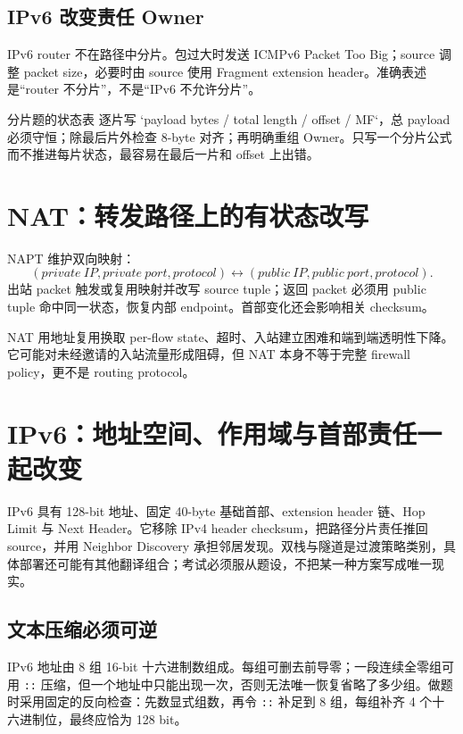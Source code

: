 \documentclass[11pt,a4paper]{ctexart}
\newcommand{\code}[1]{\texttt{#1}}
\begin{document}
\subsection{IPv6 改变责任 Owner}

IPv6 router 不在路径中分片。包过大时发送 ICMPv6 Packet Too Big；source 调整 packet size，必要时由 source 使用 Fragment extension header。准确表述是“router 不分片”，不是“IPv6 不允许分片”。

\begin{warnbox}{分片题的状态表}
逐片写 `payload bytes / total length / offset / MF`，总 payload 必须守恒；除最后片外检查 8-byte 对齐；再明确重组 Owner。只写一个分片公式而不推进每片状态，最容易在最后一片和 offset 上出错。
\end{warnbox}

\section{NAT：转发路径上的有状态改写}

NAPT 维护双向映射：
\[
(private\ IP,private\ port,protocol)
\leftrightarrow
(public\ IP,public\ port,protocol).
\]
出站 packet 触发或复用映射并改写 source tuple；返回 packet 必须用 public tuple 命中同一状态，恢复内部 endpoint。首部变化还会影响相关 checksum。

NAT 用地址复用换取 per-flow state、超时、入站建立困难和端到端透明性下降。它可能对未经邀请的入站流量形成阻碍，但 NAT 本身不等于完整 firewall policy，更不是 routing protocol。

\section{IPv6：地址空间、作用域与首部责任一起改变}

IPv6 具有 128-bit 地址、固定 40-byte 基础首部、extension header 链、Hop Limit 与 Next Header。它移除 IPv4 header checksum，把路径分片责任推回 source，并用 Neighbor Discovery 承担邻居发现。双栈与隧道是过渡策略类别，具体部署还可能有其他翻译组合；考试必须服从题设，不把某一种方案写成唯一现实。

\subsection{文本压缩必须可逆}

IPv6 地址由 8 组 16-bit 十六进制数组成。每组可删去前导零；一段连续全零组可用 \code{::} 压缩，但一个地址中只能出现一次，否则无法唯一恢复省略了多少组。做题时采用固定的反向检查：先数显式组数，再令 \code{::} 补足到 8 组，每组补齐 4 个十六进制位，最终应恰为 128 bit。
\end{document}
